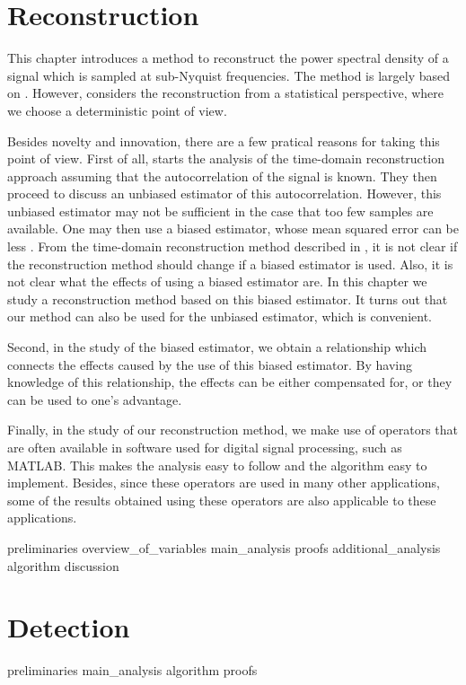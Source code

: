 \documentclass[a4paper, openany, oneside]{memoir}
\begin{document}
\chapter{Reconstruction}
This chapter introduces a method to reconstruct the power spectral density of a signal which is sampled at sub-Nyquist frequencies. The method is largely based on \cite{ariananda2012compressive}. However, \cite{ariananda2012compressive} considers the reconstruction from a statistical perspective, where we choose a deterministic point of view.

Besides novelty and innovation, there are a few pratical reasons for taking this point of view. First of all, \cite{ariananda2012compressive} starts the analysis of the time-domain reconstruction approach assuming that the autocorrelation of the signal is known. They then proceed to discuss an unbiased estimator of this autocorrelation. However, this unbiased estimator may not be sufficient in the case that too few samples are available. One may then use a biased estimator, whose mean squared error can be less \cite{percival1993univariate}. From the time-domain reconstruction method described in \cite{ariananda2012compressive}, it is not clear if the reconstruction method should change if a biased estimator is used. Also, it is not clear what the effects of using a biased estimator are. In this chapter we study a reconstruction method based on this biased estimator. It turns out that our method can also be used for the unbiased estimator, which is convenient.

Second, in the study of the biased estimator, we obtain a relationship which connects the effects caused by the use of this biased estimator. By having knowledge of this relationship, the effects can be either compensated for, or they can be used to one's advantage.

Finally, in the study of our reconstruction method, we make use of operators that are often available in software used for digital signal processing, such as MATLAB. This makes the analysis easy to follow and the algorithm easy to implement. Besides, since these operators are used in many other applications, some of the results obtained using these operators are also applicable to these applications. 

{preliminaries}
{overview_of_variables}
{main_analysis}
{proofs}
{additional_analysis}
{algorithm}
{discussion}


\chapter{Detection}

{preliminaries}
{main_analysis}
{algorithm}
{proofs}
\end{document}
